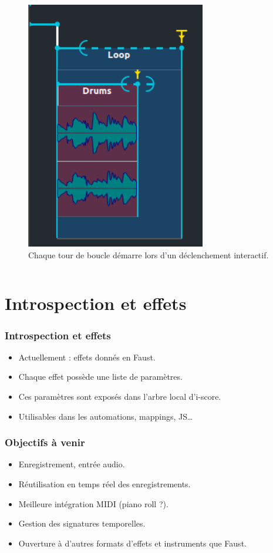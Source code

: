 \documentclass{beamer}
\begin{document}
\begin{frame}
\begin{columns}
\begin{column}{0.5\textwidth}
\begin{figure}
				\includegraphics[width=0.7\textwidth]{images/loop2.png}
				\caption{Chaque tour de boucle démarre lors d'un déclenchement interactif.}
			\end{figure}
		\end{column}
	\end{columns}
\end{frame}  

\section{Introspection et effets}
\begin{frame}
	\frametitle{Introspection et effets}    
	\Large
	\begin{itemize}
		\item<1-> Actuellement : effets donnés en Faust.
		\item<2-> Chaque effet possède une liste de paramètres.
		\item<3-> Ces paramètres sont exposés dans l'arbre local d'i-score.
		\item<4-> Utilisables dans les automations, mappings, JS\dots
	\end{itemize}	
\end{frame}

\begin{frame}
	\frametitle{Objectifs à venir} 
	\Large
	\begin{itemize}
		\item<1> Enregistrement, entrée audio.
		\item<2> Réutilisation en temps réel des enregistrements.
		\item<3> Meilleure intégration MIDI (piano roll ?).
		\item<4> Gestion des signatures temporelles.
		\item<5> Ouverture à d'autres formats d'effets et instruments que Faust.
		
	\end{itemize}
\end{frame}    
\end{document}
